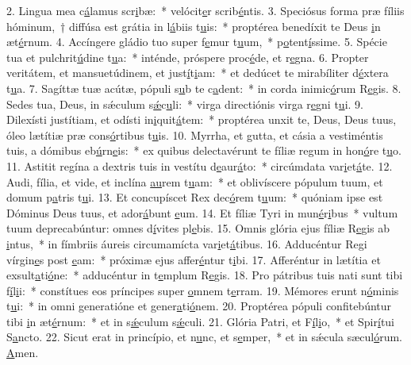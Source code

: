 2. Lingua mea c\uline{á}lamus scr\uline{i}bæ:~* velócit\uline{e}r scrib\uline{é}ntis.
3. Speciósus forma præ fíliis hóminum,~† diffúsa est grátia in l\uline{á}biis t\uline{u}is:~* proptérea benedíxit te Deus \uline{i}n æt\uline{é}rnum.
4. Accíngere gládio tuo super f\uline{e}mur t\uline{u}um,~* p\uline{o}tent\uline{í}ssime.
5. Spécie tua et pulchrit\uline{ú}dine t\uline{u}a:~* inténde, próspere proc\uline{é}de, et r\uline{e}gna.
6. Propter veritátem, et mansuetúdinem, et just\uline{í}t\uline{i}am:~* et dedúcet te mirabíliter d\uline{é}xtera t\uline{u}a.
7. Sagíttæ tuæ acútæ, pópuli s\uline{u}b te c\uline{a}dent:~* in corda inimic\uline{ó}rum R\uline{e}gis.
8. Sedes tua, Deus, in sǽculum s\uline{ǽ}c\uline{u}li:~* virga directiónis virga r\uline{e}gni t\uline{u}i.
9. Dilexísti justítiam, et odísti in\uline{i}quit\uline{á}tem:~* proptérea unxit te, Deus, Deus tuus, óleo lætítiæ præ cons\uline{ó}rtibus t\uline{u}is.
10. Myrrha, et gutta, et cásia a vestiméntis tuis, a dómibus eb\uline{ú}rn\uline{e}is:~* ex quibus delectavérunt te fíliæ regum in hon\uline{ó}re t\uline{u}o.
11. Astitit regína a dextris tuis in vestítu d\uline{e}aur\uline{á}to:~* circúmdata var\uline{i}et\uline{á}te.
12. Audi, fília, et vide, et inclína \uline{au}rem t\uline{u}am:~* et oblivíscere pópulum tuum, et domum p\uline{a}tris t\uline{u}i.
13. Et concupíscet Rex dec\uline{ó}rem t\uline{u}um:~* quóniam ipse est Dóminus Deus tuus, et ador\uline{á}bunt \uline{e}um.
14. Et fíliæ Tyri in mun\uline{é}r\uline{i}bus~* vultum tuum deprecabúntur: omnes d\uline{í}vites pl\uline{e}bis.
15. Omnis glória ejus fíliæ R\uline{e}gis ab \uline{i}ntus,~* in fímbriis áureis circumamícta var\uline{i}et\uline{á}tibus.
16. Adducéntur Regi vírgin\uline{e}s post \uline{e}am:~* próximæ ejus affer\uline{é}ntur t\uline{i}bi.
17. Afferéntur in lætítia et exsult\uline{a}ti\uline{ó}ne:~* adducéntur in t\uline{e}mplum R\uline{e}gis.
18. Pro pátribus tuis nati sunt tibi f\uline{í}l\uline{i}i:~* constítues eos príncipes super \uline{o}mnem t\uline{e}rram.
19. Mémores erunt n\uline{ó}minis t\uline{u}i:~* in omni generatióne et gener\uline{a}ti\uline{ó}nem.
20. Proptérea pópuli confitebúntur tibi \uline{i}n æt\uline{é}rnum:~* et in s\uline{ǽ}culum s\uline{ǽ}culi.
21. Glória Patri, et F\uline{í}l\uline{i}o,~* et Spir\uline{í}tui S\uline{a}ncto.
22. Sicut erat in princípio, et n\uline{u}nc, et s\uline{e}mper,~* et in sǽcula sæcul\uline{ó}rum. \uline{A}men.
